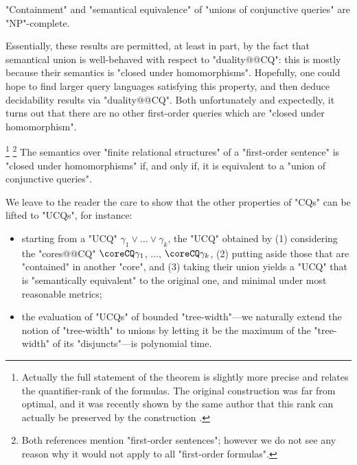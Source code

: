 \begin{corollary}
	"Containment" and "semantical equivalence" of "unions of conjunctive queries"
	are "NP"-complete.
\end{corollary}

Essentially, these results are permitted, at least in part, by the fact that semantical union
is well-behaved with respect to "duality@@CQ": this is mostly because their semantics 
is "closed under homomorphisms". Hopefully, one could hope to find larger
query languages satisfying this property, and then deduce decidability results via "duality@@CQ".
Both unfortunately and expectedly, it turns out that there
are no other first-order queries which are "closed under homomorphism".\AP
\begin{proposition}
	\!\footnote{Actually the full statement of the theorem is
	slightly more precise and relates the quantifier-rank of the formulas.
	The original construction was far from optimal, and it was
	recently shown by the same author
	that this rank can actually be preserved by the construction
	\cite[Theorem~1.4]{Rossman2025Equirank}.}%
	\footnote{Both references mention "first-order sentences"; however we do not see
	any reason why it would not apply to all "first-order formulas".}
	The semantics over "finite relational structures"
	of a "first-order sentence" is "closed under homomorphisms"
	if, and only if, it is equivalent to a "union of conjunctive queries".
\end{proposition}

We leave to the reader the care to show that the other properties of "CQs"
can be lifted to "UCQs", for instance:
\begin{itemize}
	\item starting from a "UCQ" $\gamma_1 \lor \dotsc \lor \gamma_k$,
		the "UCQ" obtained by (1) considering the "cores@@CQ"
		$\coreCQ\gamma_1$, $\dotsc$, $\coreCQ\gamma_k$,
		(2) putting aside those that are "contained" in another "core",
		and (3) taking their union
		yields a "UCQ" that is "semantically equivalent" to the
		original one, and minimal under most reasonable metrics;
	\item the evaluation of "UCQs" of bounded "tree-width"---we naturally
		extend the notion of "tree-width" to unions by letting it
		be the maximum of the "tree-width" of its "disjuncts"---is
		polynomial time. 
\end{itemize}